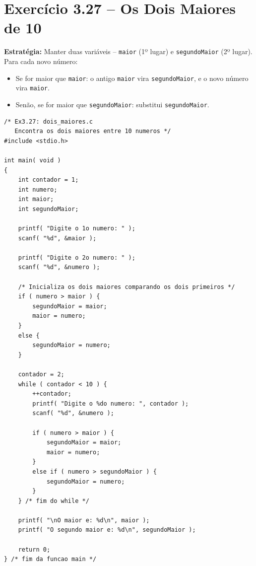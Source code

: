 \documentclass[12pt,a4paper]{article}
\begin{document}
\section{Exercício 3.27 -- Os Dois Maiores de 10}

\begin{respostabox}
\textbf{Estratégia:} Manter duas variáveis -- \texttt{maior} (1º lugar) e
\texttt{segundoMaior} (2º lugar). Para cada novo número:
\begin{itemize}[noitemsep]
  \item Se for maior que \texttt{maior}: o antigo \texttt{maior} vira \texttt{segundoMaior},
  e o novo número vira \texttt{maior}.
  \item Senão, se for maior que \texttt{segundoMaior}: substitui \texttt{segundoMaior}.
\end{itemize}

\begin{lstlisting}
/* Ex3.27: dois_maiores.c
   Encontra os dois maiores entre 10 numeros */
#include <stdio.h>

int main( void )
{
    int contador = 1;
    int numero;
    int maior;
    int segundoMaior;

    printf( "Digite o 1o numero: " );
    scanf( "%d", &maior );

    printf( "Digite o 2o numero: " );
    scanf( "%d", &numero );

    /* Inicializa os dois maiores comparando os dois primeiros */
    if ( numero > maior ) {
        segundoMaior = maior;
        maior = numero;
    }
    else {
        segundoMaior = numero;
    }

    contador = 2;
    while ( contador < 10 ) {
        ++contador;
        printf( "Digite o %do numero: ", contador );
        scanf( "%d", &numero );

        if ( numero > maior ) {
            segundoMaior = maior;
            maior = numero;
        }
        else if ( numero > segundoMaior ) {
            segundoMaior = numero;
        }
    } /* fim do while */

    printf( "\nO maior e: %d\n", maior );
    printf( "O segundo maior e: %d\n", segundoMaior );

    return 0;
} /* fim da funcao main */
\end{lstlisting}
\end{respostabox}

\end{document}
